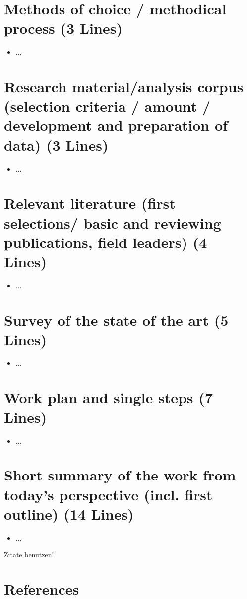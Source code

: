 \documentclass[12pt]{scrartcl}
\begin{document}
\section*{Methods of choice / methodical process (3 Lines)}

\begin{itemize}
    \item ...
 
\end{itemize}


\section*{Research material/analysis corpus (selection criteria / amount / development and preparation of data) (3 Lines)}

\begin{itemize}
    \item ...
 
\end{itemize}


\section*{Relevant literature (first selections/ basic and reviewing publications, field leaders) (4 Lines) }
\begin{itemize}
    \item ...
 
\end{itemize}


\section*{Survey of the state of the art (5 Lines)}
\begin{itemize}
    \item ...
 
\end{itemize}

\section*{Work plan and single steps (7 Lines)}
\begin{itemize}
    \item ...
 
\end{itemize}

\section*{Short summary of the work from today’s perspective (incl. first outline) (14 Lines)}
\begin{itemize}
    \item ...
 
\end{itemize}




Zitate benutzen! \cite{microBpm}
\section*{References}
\printbibliography[heading=none]
\end{document}
